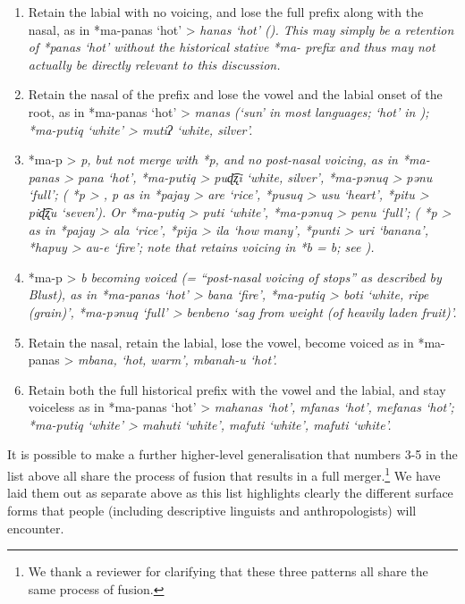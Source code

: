\begin{enumerate}
	\item	Retain the labial with no voicing,
				and lose the full prefix along with the nasal,
				as in *ma-panas ‘hot’ > \it{hanas} ‘hot’ ().
				This may simply be a retention of *panas ‘hot’ without the historical
				stative *ma- prefix and thus may not actually be directly relevant to this discussion.
	\item	Retain the nasal of the prefix
				and lose the vowel
				and the labial onset of the root,
				as in *ma-panas ‘hot’ >  \it{manas} (‘sun’ in most  languages;
				‘hot’ in ); *ma-putiq ‘white’ >  \it{mutiʔ} ‘white, silver’.
	\item	*ma-p > \it{p},
				but not merge with *p,
				and no post-nasal voicing,
				as in  *ma-panas > \it{pana} ‘hot’,
				*ma-putiq > \it{puɖ͡ʐi} ‘white,
				silver’, *ma-pənuq > \it{pənu} ‘full’; ( *p > {\0},
				\it{p} as in *pajay > \it{are} ‘rice’,
				*pusuq > \it{usu} ‘heart’,
				*pitu > \it{piɖ͡ʐu} ‘seven’).
				Or  *ma-putiq > \it{puti} ‘white’,
				*ma-pənuq > \it{penu} ‘full’; ( *p > {\0} as in *pajay >
				\it{ala} ‘rice’, *pija > \it{ila} ‘how many’,
				*punti > \it{uri} ‘banana’,
				*hapuy > \it{au-e} ‘fire’; note that  retains voicing in
				*b = \it{b}; see ).
	\item	*ma-p > \it{b} becoming voiced (= “post-nasal voicing of
				stops” as described by Blust),
				as in  *ma-panas ‘hot’ > \it{bana} ‘fire’,
				*ma-putiq > \it{boti} ‘white,
				ripe (grain)’, *ma-pənuq ‘full’ > \it{ben{\tl}beno} ‘sag from weight
				(of heavily laden fruit)’.
	\item	Retain the nasal,
				retain the labial, lose the vowel,
				become voiced as in  *ma-panas > \it{mbana},
				‘hot, warm’, \it{mbanah-u} ‘hot’.
	\item	Retain both the full historical prefix with the vowel
				and the labial, and stay voiceless as in *ma-panas ‘hot’ > 
				\it{mahanas} ‘hot’,  \it{mfanas} ‘hot’,  \it{mefanas} ‘hot’; *ma-putiq
				‘white’ >  \it{mahuti} ‘white’,
				 \it{mafuti} ‘white’,  \it{mafuti} ‘white’.
\end{enumerate}

It is possible to make a further higher-level generalisation
that numbers 3-5 in the list above all share the process of fusion
that results in a full merger.\footnote{
		We thank a reviewer for clarifying that these three patterns all share the same process of fusion.}
We have laid them out as separate above as this list highlights
clearly the different surface forms that people (including descriptive
linguists and anthropologists) will encounter.

